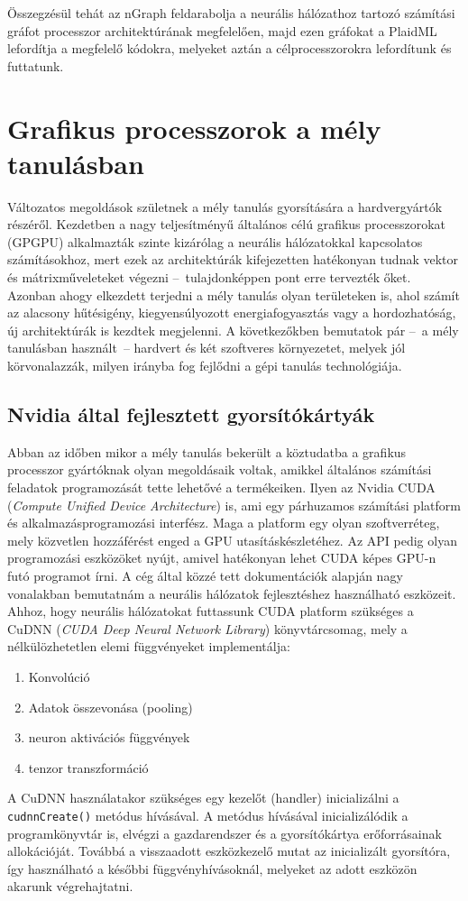 Összegzésül tehát az nGraph feldarabolja a neurális hálózathoz tartozó számítási gráfot processzor architektúrának megfelelően, majd ezen gráfokat a PlaidML lefordítja a megfelelő kódokra, melyeket aztán a célprocesszorokra lefordítunk és futtatunk.

\section{Grafikus processzorok a mély tanulásban}
Változatos megoldások születnek a mély tanulás gyorsítására a hardvergyártók részéről. Kezdetben a nagy teljesítményű általános célú grafikus processzorokat (GPGPU) alkalmazták szinte kizárólag a neurális hálózatokkal kapcsolatos számításokhoz, mert ezek az architektúrák kifejezetten hatékonyan tudnak vektor és mátrixműveleteket végezni --~tulajdonképpen pont erre tervezték őket. Azonban ahogy elkezdett terjedni a mély tanulás olyan területeken is, ahol számít az alacsony hűtésigény, kiegyensúlyozott energiafogyasztás vagy a hordozhatóság, új architektúrák is kezdtek megjelenni. A következőkben bemutatok pár --~a mély tanulásban használt~-- hardvert és két szoftveres környezetet, melyek jól körvonalazzák, milyen irányba fog fejlődni a gépi tanulás technológiája.

\subsection{Nvidia által fejlesztett gyorsítókártyák}
Abban az időben mikor a mély tanulás bekerült a köztudatba a grafikus processzor gyártóknak olyan megoldásaik voltak, amikkel általános számítási feladatok programozását tette lehetővé a termékeiken. Ilyen az Nvidia CUDA (\emph{Compute Unified Device Architecture}) is, ami egy párhuzamos számítási platform és alkalmazásprogramozási interfész. Maga a platform egy olyan szoftverréteg, mely közvetlen hozzáférést enged a GPU utasításkészletéhez.\cite{wiki:cuda} Az API pedig olyan programozási eszközöket nyújt, amivel hatékonyan lehet CUDA képes GPU-n futó programot írni. A cég által közzé tett dokumentációk alapján nagy vonalakban bemutatnám a neurális hálózatok fejlesztéshez használható eszközeit.\cite{web:cudnn}
Ahhoz, hogy neurális hálózatokat futtassunk CUDA platform szükséges a CuDNN (\emph{CUDA Deep Neural Network Library}) könyvtárcsomag, mely a nélkülözhetetlen elemi függvényeket implementálja:
\begin{enumerate}
	\item Konvolúció
	\item Adatok összevonása (pooling)
	\item neuron aktivációs függvények
	\item tenzor transzformáció
\end{enumerate}
A CuDNN használatakor szükséges egy kezelőt (handler) inicializálni a \verb|cudnnCreate()| metódus hívásával. A metódus hívásával inicializálódik a programkönyvtár is, elvégzi a gazdarendszer és a gyorsítókártya erőforrásainak allokációját. Továbbá a visszaadott eszközkezelő mutat az inicializált gyorsítóra, így használható a későbbi függvényhívásoknál, melyeket az adott eszközön akarunk végrehajtatni.

